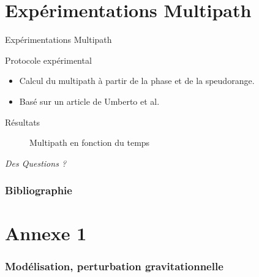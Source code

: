 \documentclass[xcolor=dvipsnames,envcountsect]{beamer}
\makeatletter
\let\beamer@writeslidentry@miniframeson=\beamer@writeslidentry
\def\beamer@writeslidentry@miniframesoff{%
  \expandafter\beamer@ifempty\expandafter{\beamer@framestartpage}{}%
  {%
    \clearpage\beamer@notesactions%
  }
}
\newcommand*{\miniframeson}{\let\beamer@writeslidentry=\beamer@writeslidentry@miniframeson}
\newcommand*{\miniframesoff}{\let\beamer@writeslidentry=\beamer@writeslidentry@miniframesoff}
\makeatother
\begin{document}
\section{Expérimentations Multipath}
\begin{frame}
	\centering
	\begin{block}
		\scshape
		\begin{center}
			\Huge Expérimentations Multipath
		\end{center}
	\end{block}
\end{frame}

\begin{frame}{Protocole expérimental}
	\begin{itemize}
		\item Calcul du multipath à partir de la phase et de la speudorange.
		\item Basé sur un article de Umberto et al. \cite{mi8}
	\end{itemize}
\end{frame}

\begin{frame}{Résultats}
	\begin{figure}
		\centering
		\caption {Multipath en fonction du temps}	
	\end{figure}
\end{frame}
\miniframesoff
\begin{frame}
	\centering
	\begin{block}
		\scshape
			\begin{center}
				\Huge\emph{Des Questions ?}
			\end{center}
	\end{block}
\end{frame}

\miniframeson
\appendix
\begin{frame}[allowframebreaks]
	\frametitle{Bibliographie}
	\printbibliography
\end{frame}

\section{Annexe 1}
\begin{frame}
	\label{appendix:1}
	\frametitle{Modélisation, perturbation gravitationnelle}
	
\end{frame}
\end{document}
